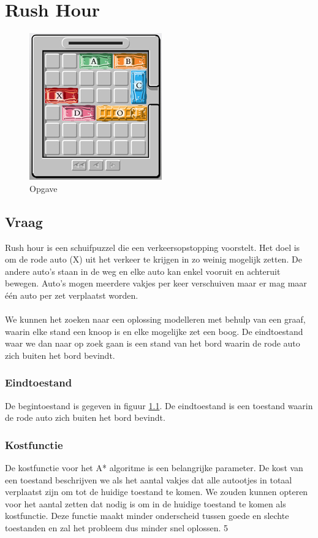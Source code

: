 \documentclass[alternative-exam.tex]{subfiles}
\begin{document}
\chapter{Rush Hour}
\begin{figure}[H]
\label{rushour}
\caption{Opgave}
\begin{center}
\includegraphics[scale=1.25]{resources/pictures/rushhour.jpg}
\end{center}
\end{figure}

\section{Vraag}
Rush hour is een schuifpuzzel die een verkeersopstopping voorstelt. Het doel is om de rode auto (X) uit het verkeer te krijgen in zo weinig mogelijk zetten. De andere auto's staan in de weg en elke auto kan enkel vooruit en achteruit bewegen. Auto's mogen meerdere vakjes per keer verschuiven maar er mag maar \'e\'en auto per zet verplaatst worden.\\\\
We kunnen het zoeken naar een oplossing modelleren met behulp van een graaf, waarin elke stand een knoop is en elke mogelijke zet een boog. De eindtoestand waar we dan naar op zoek gaan is een stand van het bord waarin de rode auto zich buiten het bord bevindt.

\subsection{Eindtoestand} De begintoestand is gegeven in figuur \ref{rushour}. De eindtoestand is een toestand waarin de rode auto zich buiten het bord bevindt. 

\subsection{Kostfunctie}De kostfunctie voor het A* algoritme is een belangrijke parameter. De kost van een toestand beschrijven we als het aantal vakjes dat alle autootjes in totaal verplaatst zijn om tot de huidige toestand te komen. We zouden kunnen opteren voor het aantal zetten dat nodig is om in de huidige toestand te komen als kostfunctie. Deze functie maakt minder onderscheid tussen goede en slechte toestanden en zal het probleem dus minder snel oplossen.
5
\end{document}
